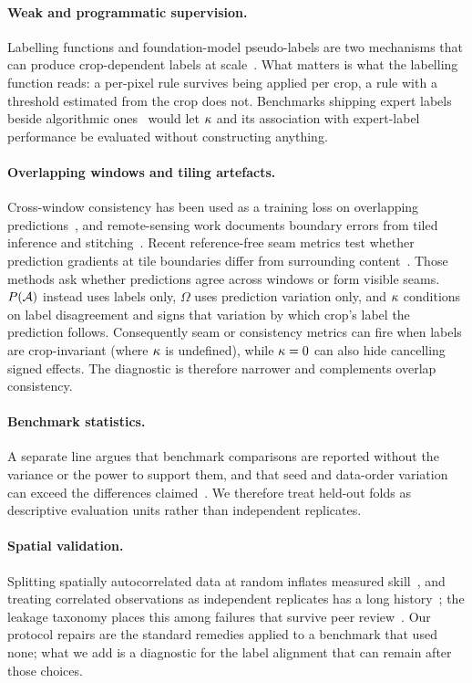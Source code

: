 \paragraph{Weak and programmatic supervision.} Labelling functions and
foundation-model pseudo-labels are two mechanisms that can produce crop-dependent
labels at scale~\cite{ratner2017snorkel,wang2023samrs}. What matters is what the labelling
function reads: a per-pixel rule survives being applied per crop, a rule with a
threshold estimated from the crop does not. Benchmarks shipping expert labels beside
algorithmic ones~\cite{aybar2022cloudsen12} would let $\kappa$ and its association with
expert-label performance be
evaluated without constructing anything.

\paragraph{Overlapping windows and tiling artefacts.} Cross-window consistency has
been used as a training loss on overlapping predictions~\cite{dang2023crosswindow},
and remote-sensing work documents boundary errors from tiled inference and
stitching~\cite{huang2019tiling}. Recent reference-free seam metrics test whether
prediction gradients at tile boundaries differ from surrounding
content~\cite{carrara2026switi}. Those methods ask whether predictions agree across
windows or form visible seams. $P(\mathcal{A})$ instead uses labels only, $\Omega$ uses
prediction variation only, and $\kappa$ conditions on label disagreement and signs
that variation by which crop's label the prediction follows. Consequently seam or
consistency metrics can fire when labels are crop-invariant (where $\kappa$ is
undefined), while $\kappa=0$ can also hide cancelling signed effects. The diagnostic
is therefore narrower and complements overlap consistency.

\paragraph{Benchmark statistics.} A separate line argues that benchmark comparisons
are reported without the variance or the power to support them, and that seed and
data-order variation can exceed the differences
claimed~\cite{bouthillier2021accounting, reimers2017reporting, card2020little,
damour2022underspecification}. We therefore treat held-out folds as descriptive
evaluation units rather than independent replicates.

\paragraph{Spatial validation.} Splitting spatially autocorrelated data at random
inflates measured skill~\cite{roberts2017cross, ploton2020spatial,
karasiak2022spatial, kattenborn2022spatially}, and treating correlated observations
as independent replicates has a long history~\cite{hurlbert1984pseudoreplication};
the leakage taxonomy places this among failures that survive peer
review~\cite{kapoor2023leakage}. Our protocol repairs are the standard remedies
applied to a benchmark that used none; what we add is a diagnostic for the label
alignment that can remain after those choices.

